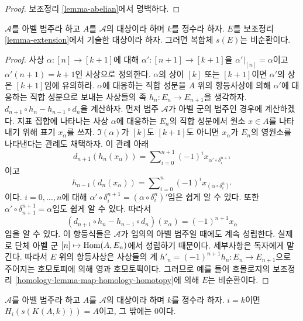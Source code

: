 \begin{proof}
보조정리 \ref{lemma-abelian}에서 명백하다.
\end{proof}

\begin{lemma}
\label{lemma-homology-extension}
$\mathcal{A}$를 아벨 범주라 하고 $A$를 $\mathcal{A}$의 대상이라 하며
$k$를 정수라 하자. $E$를 보조정리 \ref{lemma-extension}에서 기술한
대상이라 하자. 그러면 복합체 $s(E)$는 비순환이다.
\end{lemma}

\begin{proof}
사상 $\alpha : [n] \to [k + 1]$에 대해 $\alpha' : [n + 1] \to [k + 1]$을
$\alpha'|_{[n]} = \alpha$이고 $\alpha'(n + 1) = k + 1$인 사상으로
정의한다. $\alpha$의 상이 $[k]$ 또는 $[k + 1]$이면 $\alpha'$의 상은
$[k + 1]$임에 유의하라. $\alpha$에 대응하는 직합 성분을 $A$ 위의
항등사상에 의해 $\alpha'$에 대응하는 직합 성분으로 보내는 사상들의
족 $h_n : E_n \to E_{n + 1}$을 생각하자.
$d_{n + 1} \circ h_n - h_{n - 1} \circ d_n$을 계산하자.
먼저 범주 $\mathcal{A}$가 아벨 군의 범주인 경우에 계산하겠다.
지표 집합에 나타나는 사상 $\alpha$에 대응하는 $E_n$의 직합 성분에서
원소 $x \in A$를 나타내기 위해 표기 $x_\alpha$를 쓰자.
$\Im(\alpha)$가 $[k]$도 $[k + 1]$도 아니면 $x_\alpha$가 $E_n$의
영원소를 나타낸다는 관례도 채택하자. 이 관례 아래
$$
d_{n + 1}(h_n(x_\alpha)) =
\sum\nolimits_{i = 0}^{n + 1} (-1)^i x_{\alpha' \circ \delta^{n + 1}_i}
$$
이고
$$
h_{n - 1}(d_n(x_\alpha)) =
\sum\nolimits_{i = 0}^n (-1)^i x_{(\alpha \circ \delta_i^n)'}
$$
이다. $i = 0, \ldots, n$에 대해
$\alpha' \circ \delta^{n + 1}_i = (\alpha \circ \delta_i^n)'$임은 쉽게
알 수 있다. 또한 $\alpha' \circ \delta^{n + 1}_{n + 1} = \alpha$임도
쉽게 알 수 있다. 따라서
$$
(d_{n + 1} \circ h_n - h_{n - 1} \circ d_n)(x_\alpha)
=
(-1)^{n + 1} x_\alpha
$$
임을 알 수 있다. 이 항등식들은 $\mathcal{A}$가 임의의 아벨 범주일
때에도 계속 성립한다. 실제로 단체 아벨 군
$[n] \mapsto \mathop{\mathrm{Hom}}\nolimits(A, E_n)$에서 성립하기 때문이다. 세부사항은 독자에게
맡긴다. 따라서 $E$ 위의 항등사상은 사상들의 계
$h'_n = (-1)^{n + 1}h_n : E_n \to E_{n + 1}$으로 주어지는 호모토피에
의해 영과 호모토픽이다. 그러므로 예를 들어 호몰로지의 보조정리
\ref{homology-lemma-map-homology-homotopy}에 의해 $E$는 비순환이다.
\end{proof}

\begin{lemma}
\label{lemma-homology-eilenberg-maclane}
$\mathcal{A}$를 아벨 범주라 하고 $A$를 $\mathcal{A}$의 대상이라 하며
$k$를 정수라 하자. $i = k$이면 $H_i(s(K(A, k))) = A$이고, 그 밖에는
$0$이다.
\end{lemma}

